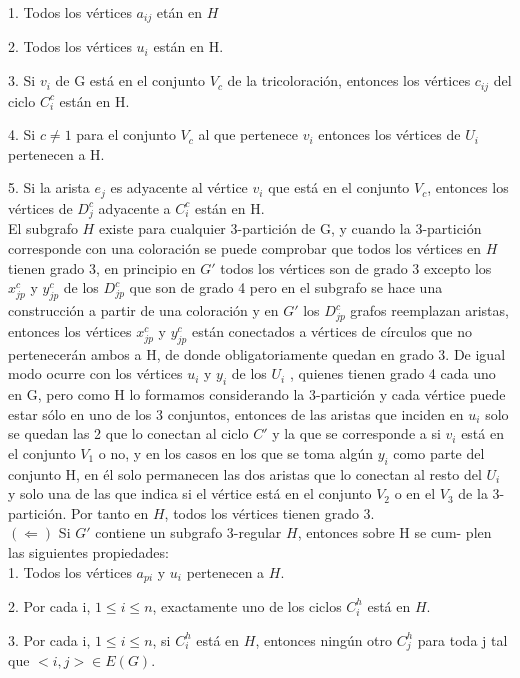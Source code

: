 \documentclass[
10pt, %
a4paper, %
oneside, %
headinclude,footinclude, %
BCOR5mm, %
]{scrartcl}
\begin{document}
1. Todos los vértices $a_{ij}$ etán en $H$

2. Todos los vértices $u_i$ est\'an en H.

3. Si $v_i$ de G est\'a en el conjunto $V_c$ de la tricoloraci\'on, entonces los v\'ertices $c_{ij}$ del ciclo $C^c_i$ est\'an en H.

4. Si $ c \neq 1$ para el conjunto $V_c$ al que pertenece $v_i$ entonces los vértices de $U_i$ pertenecen a H.

5. Si la arista $e_j$ es adyacente al v\'ertice $v_i$ que est\'a en el conjunto $V_c$, entonces los v\'ertices de $D^c_j$ adyacente a $C^c_i$ est\'an en H. \\


El subgrafo $H$ existe para cualquier 3-partición de G, y cuando la 3-partición corresponde con una coloración se puede comprobar que todos los vértices en
$H$ tienen grado 3, en principio en $G'$ todos los vértices son de grado 3 excepto los $x_{jp}^{c}$ y $y_{jp}^{c}$ de los $D_{jp}^{c}$ que son de grado 4 pero en el subgrafo se hace 
una construcción a partir de una coloración y en $G'$ los $D_{jp}^{c}$ grafos reemplazan aristas, entonces los vértices $x_{jp}^{c}$ y $y_{jp}^{c}$ están conectados a vértices de círculos que
no pertenecerán ambos a H, de donde obligatoriamente quedan en grado 3. De
igual modo ocurre con los vértices $u_i$ y $y_i$ de los $U_i$ , quienes tienen grado 4 cada uno en G, pero como H lo formamos considerando la 3-partición y cada vértice
puede estar sólo en uno de los 3 conjuntos, entonces de las aristas que inciden
en $u_i$ solo se quedan las 2 que lo conectan al ciclo $C'$ y la que se corresponde a
si $v_i$ está en el conjunto $V_1$ o no, y en los casos en los que se toma algún $y_i$ como
parte del conjunto H, en él solo permanecen las dos aristas que lo conectan
al resto del $U_i$ y solo una de las que indica si el vértice está en el conjunto $V_2$
o en el $V_3$ de la 3-partición. Por tanto en $H$, todos los vértices tienen grado 3. \\


$(\Leftarrow )$ Si $G'$ contiene un subgrafo 3-regular $H$, entonces sobre H se cum-
plen las siguientes propiedades: \\


1. Todos los vértices $a_{pi}$ y $u_i$ pertenecen a $H$.

2. Por cada i, $1 \leq i \leq n$, exactamente uno de los ciclos $C^h_i$ está en $H$.

3. Por cada i, $1 \leq i \leq n$, si $C^h_i$ está en $H$, entonces ningún otro $C^h_j$ para
toda j tal que $< i, j > \in E(G)$. \\
\end{document}
